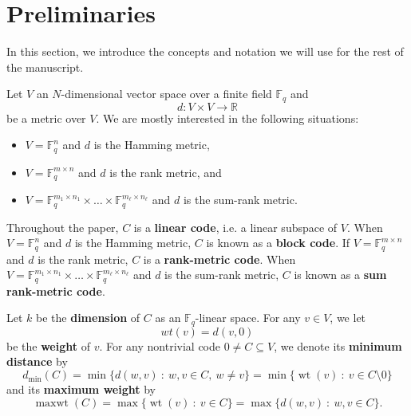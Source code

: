 \documentclass[12pt]{amsart}
\numberwithin{equation}{section}
\DeclareMathOperator{\wt}{wt}
\DeclareMathOperator{\maxwt}{maxwt}
\theoremstyle{definition}
\newcommand{\FF}{\mathbb{F}}
\begin{document}
\section{Preliminaries}\label{prelimiaries}

In this section, we introduce the concepts and notation we will use for the rest of the manuscript.

Let $V$ an $N$-dimensional vector space over a finite field $\mathbb{F}_q$ and $$d : V\times V\rightarrow\mathbb{R}$$ be a metric over $V$. We are mostly interested in the following situations:
\begin{itemize}
    \item $V=\FF_q^n$ and $d$ is the Hamming metric,
    \item $V=\mathbb{F}_q^{m\times n}$ and $d$ is the rank metric, and
    \item $V=\mathbb{F}_q^{m_1\times n_1}\times\ldots\times\FF_q^{m_\ell\times n_\ell}$ and $d$ is the sum-rank metric.
\end{itemize}

Throughout the paper, $C$ is a {\bf linear code}, i.e. a linear subspace of $V$. When $V = \FF_q^n$ and $d$ is the Hamming metric, $C$ is known as a {\bf block code}. If $V=\mathbb{F}_q^{m\times n}$ and $d$ is the rank metric, $C$ is a {\bf rank-metric code}. When $V=\mathbb{F}_q^{m_1\times n_1}\times\ldots\times\FF_q^{m_\ell\times n_\ell}$ and $d$ is the sum-rank metric, $C$ is known as a {\bf sum rank-metric code}.

Let $k$ be the {\bf dimension} of $C$ as an $\FF_q$-linear space. For any $v\in V$, we let $$wt(v)=d(v,0)$$ be the {\bf weight} of $v$. For any nontrivial code $0\neq C\subseteq V$, we denote its {\bf minimum distance} by
$$d_{\min}(C)=\min\{d(w,v)\ :\ w,v\in C,\ w\neq v\}=\min\{\wt(v)\ :\ v\in C\setminus 0\}$$
and its {\bf maximum weight} by $$\maxwt(C)=\max\{\wt(v)\ :\ v\in C\}=\max\{d(w,v)\ :\ w,v\in C\}.$$
\end{document}
